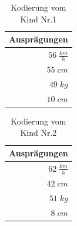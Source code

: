             \begin{multicols}{2}
                \begin{table}[H]
                    \begin{center}
                    \begin{tabular}{ |r| } 
                        \hline
                        \hfill Ausprägungen  \\ \hline
                        \cellcolor{blue!25}   $ 56\; \frac{km}{h}$ \\ \hline
                        \cellcolor{yellow!25} $ 55\; cm          $ \\ \hline
                        \cellcolor{yellow!25} $ 49\; kg          $ \\ \hline
                        \cellcolor{blue!25}   $ 10\; cm          $ \\ \hline
                    \end{tabular}
                    \end{center}
                    \caption{Kodierung vom Kind Nr.1 \label{fig:somelabel}}
                \end{table}


                \begin{table}[H]
                    \begin{center}
                    \begin{tabular}{ |r| } 
                        \hline
                        \hfill Ausprägungen  \\ \hline
                        \cellcolor{yellow!25} $ 62\; \frac{km}{h}$ \\ \hline
                        \cellcolor{blue!25}   $ 42\; cm          $ \\ \hline
                        \cellcolor{blue!25}   $ 51\; kg          $ \\ \hline
                        \cellcolor{yellow!25} $  8\; cm          $ \\ \hline
                    \end{tabular}
                    \end{center}
                    \caption{Kodierung vom Kind Nr.2 \label{fig:somelabel}}
                \end{table}
            \end{multicols}

